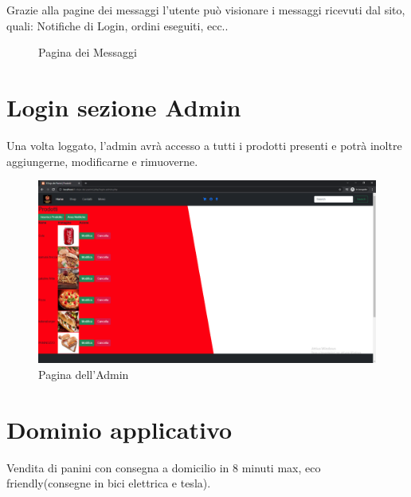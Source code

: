 \documentclass[a4paper,12pt]{report}
\begin{document}
	\textsf{\small Grazie alla pagine dei messaggi l'utente può visionare i messaggi ricevuti dal sito, quali: Notifiche di Login, ordini eseguiti, ecc..}\\
	
	\begin{figure}[H] 
		\centering
		\caption{Pagina dei Messaggi}
		\label{fig:messaggi}
	\end{figure}
	
	
	\newpage
	
	\section{Login sezione Admin}
	
	\textsf{\small Una volta loggato, l'admin avrà accesso a tutti i prodotti presenti e potrà inoltre aggiungerne, modificarne e rimuoverne.}\\
	
	\begin{figure}[H] 
		\centering
		\includegraphics[width=1\textwidth, height=1\textheight, keepaspectratio]{./Images/Admin.png}
		\caption{Pagina dell'Admin}
		\label{fig:admin}
	\end{figure}
	
	
	\newpage
	
	\section{Dominio applicativo}
	Vendita di panini con consegna a domicilio in 8 minuti max, eco friendly(consegne in bici elettrica e tesla).
	
\end{document}
